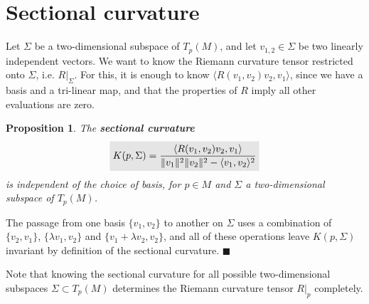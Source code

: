 \documentclass[letter-paper]{tufte-book}
\newtheorem{proposition}[theorem]{\color{pastel-blue}Proposition}
\newenvironment{proof}[1][Proof]{\begin{trivlist}
\item[\hskip \labelsep {\bfseries #1}]}{\end{trivlist}}
\newcommand{\qed}{\hfill$\blacksquare$}
\newcommand{\highlight}[1]{\mathchoice%
  {\colorbox{black!10}{$\displaystyle#1$}}%
  {\colorbox{black!10}{$\textstyle#1$}}%
  {\colorbox{black!10}{$\scriptstyle#1$}}%
  {\colorbox{black!10}{$\scriptscriptstyle#1$}}}%
\begin{document}

\section{Sectional curvature}

Let $\Sigma$ be a two-dimensional subspace of $T_p(M)$, and let $v_{1,2} \in \Sigma$ be two linearly independent vectors. We want to know the Riemann curvature tensor restricted onto $\Sigma$, i.e. $R|_\Sigma$. For this, it is enough to know $\langle R(v_1, v_2)v_2, v_1\rangle$, since we have a basis and a tri-linear map, and that the properties of $R$ imply all other evaluations are zero.

\begin{proposition}
  The \textbf{sectional curvature}
  \begin{equation}
    \highlight{K(p, \Sigma) = \frac{\langle R(v_1, v_2)v_2, v_1\rangle}{\|v_1\|^2 \|v_2\|^2 - \langle v_1, v_2\rangle^2}}
  \end{equation}
  is independent of the choice of basis, for $p\in M$ and $\Sigma$ a two-dimensional subspace of $T_p(M)$.
\end{proposition}

\begin{proof}
  The passage from one basis $\{v_1, v_2\}$ to another on $\Sigma$ uses a combination of $\{v_2, v_1\}$, $\{\lambda v_1, v_2\}$ and $\{v_1 + \lambda v_2, v_2\}$, and all of these operations leave $K(p, \Sigma)$ invariant by definition of the sectional curvature. \qed
\end{proof}

Note that knowing the sectional curvature for all possible two-dimensional subspaces $\Sigma \subset T_p(M)$ determines the Riemann curvature tensor $R|_p$ completely.
\end{document}
